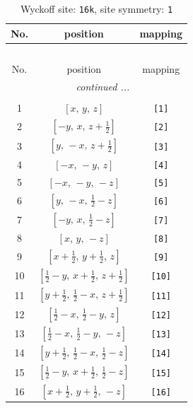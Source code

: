 \documentclass[fleqn,8pt]{jsarticle}
\begin{document}
\begin{longtable}{ccc}
\caption{Wyckoff site: {\tt 16k}, site symmetry: {\tt 1}}
 \\
 \hline \hline
No. & position & mapping \\ \hline \endfirsthead

\multicolumn{2}{l}{\tablename\ \thetable{}} \\
 \hline \hline
No. & position & mapping \\ \hline \endhead

 \hline \hline
\multicolumn{2}{r}{\footnotesize\it continued ...} \\ \endfoot

 \hline \hline
\multicolumn{2}{r}{} \\ \endlastfoot

1 & $\left[ x,\, y,\, z \right]$ & {\tt [1]} \\ \hline
2 & $\left[ - y,\, x,\, z + \frac{1}{2} \right]$ & {\tt [2]} \\ \hline
3 & $\left[ y,\, - x,\, z + \frac{1}{2} \right]$ & {\tt [3]} \\ \hline
4 & $\left[ - x,\, - y,\, z \right]$ & {\tt [4]} \\ \hline
5 & $\left[ - x,\, - y,\, - z \right]$ & {\tt [5]} \\ \hline
6 & $\left[ y,\, - x,\, \frac{1}{2} - z \right]$ & {\tt [6]} \\ \hline
7 & $\left[ - y,\, x,\, \frac{1}{2} - z \right]$ & {\tt [7]} \\ \hline
8 & $\left[ x,\, y,\, - z \right]$ & {\tt [8]} \\ \hline
9 & $\left[ x + \frac{1}{2},\, y + \frac{1}{2},\, z \right]$ & {\tt [9]} \\ \hline
10 & $\left[ \frac{1}{2} - y,\, x + \frac{1}{2},\, z + \frac{1}{2} \right]$ & {\tt [10]} \\ \hline
11 & $\left[ y + \frac{1}{2},\, \frac{1}{2} - x,\, z + \frac{1}{2} \right]$ & {\tt [11]} \\ \hline
12 & $\left[ \frac{1}{2} - x,\, \frac{1}{2} - y,\, z \right]$ & {\tt [12]} \\ \hline
13 & $\left[ \frac{1}{2} - x,\, \frac{1}{2} - y,\, - z \right]$ & {\tt [13]} \\ \hline
14 & $\left[ y + \frac{1}{2},\, \frac{1}{2} - x,\, \frac{1}{2} - z \right]$ & {\tt [14]} \\ \hline
15 & $\left[ \frac{1}{2} - y,\, x + \frac{1}{2},\, \frac{1}{2} - z \right]$ & {\tt [15]} \\ \hline
16 & $\left[ x + \frac{1}{2},\, y + \frac{1}{2},\, - z \right]$ & {\tt [16]} \\
\end{longtable}
\end{document}
